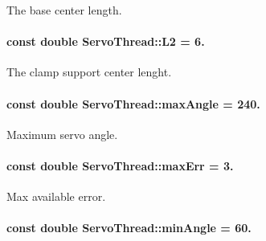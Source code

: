 The base center length. 

\hypertarget{a00009_a3d51c16b1f498b48a6ecbfaadaba6ed2}{}
\paragraph[{L2}]{\setlength{\rightskip}{0pt plus 5cm}const double Servo\+Thread\+::\+L2 = 6.\hspace{0.3cm}{\ttfamily [private]}}\label{a00009_a3d51c16b1f498b48a6ecbfaadaba6ed2}


The clamp support center lenght. 

\hypertarget{a00009_a77cc2aed4eff12967e346cb64f6be192}{}
\paragraph[{max\+Angle}]{\setlength{\rightskip}{0pt plus 5cm}const double Servo\+Thread\+::max\+Angle = 240.\hspace{0.3cm}{\ttfamily [private]}}\label{a00009_a77cc2aed4eff12967e346cb64f6be192}


Maximum servo angle. 

\hypertarget{a00009_a3ecb7da23afe91883435f239bd08ceb3}{}
\paragraph[{max\+Err}]{\setlength{\rightskip}{0pt plus 5cm}const double Servo\+Thread\+::max\+Err = 3.\hspace{0.3cm}{\ttfamily [private]}}\label{a00009_a3ecb7da23afe91883435f239bd08ceb3}


Max available error. 

\hypertarget{a00009_a9af4e0214b1b5c64978bbef49cde6d3c}{}
\paragraph[{min\+Angle}]{\setlength{\rightskip}{0pt plus 5cm}const double Servo\+Thread\+::min\+Angle = 60.\hspace{0.3cm}{\ttfamily [private]}}\label{a00009_a9af4e0214b1b5c64978bbef49cde6d3c}


